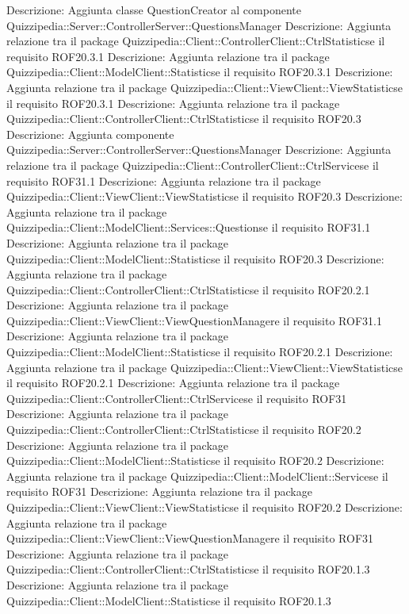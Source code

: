 Descrizione: Aggiunta classe QuestionCreator al componente Quizzipedia::Server::ControllerServer::QuestionsManager 
Descrizione: Aggiunta relazione tra il package Quizzipedia::Client::ControllerClient::CtrlStatisticse il requisito ROF20.3.1 
Descrizione: Aggiunta relazione tra il package Quizzipedia::Client::ModelClient::Statisticse il requisito ROF20.3.1 
Descrizione: Aggiunta relazione tra il package Quizzipedia::Client::ViewClient::ViewStatisticse il requisito ROF20.3.1 
Descrizione: Aggiunta relazione tra il package Quizzipedia::Client::ControllerClient::CtrlStatisticse il requisito ROF20.3 
Descrizione: Aggiunta componente Quizzipedia::Server::ControllerServer::QuestionsManager 
Descrizione: Aggiunta relazione tra il package Quizzipedia::Client::ControllerClient::CtrlServicese il requisito ROF31.1 
Descrizione: Aggiunta relazione tra il package Quizzipedia::Client::ViewClient::ViewStatisticse il requisito ROF20.3 
Descrizione: Aggiunta relazione tra il package Quizzipedia::Client::ModelClient::Services::Questionse il requisito ROF31.1 
Descrizione: Aggiunta relazione tra il package Quizzipedia::Client::ModelClient::Statisticse il requisito ROF20.3 
Descrizione: Aggiunta relazione tra il package Quizzipedia::Client::ControllerClient::CtrlStatisticse il requisito ROF20.2.1 
Descrizione: Aggiunta relazione tra il package Quizzipedia::Client::ViewClient::ViewQuestionManagere il requisito ROF31.1 
Descrizione: Aggiunta relazione tra il package Quizzipedia::Client::ModelClient::Statisticse il requisito ROF20.2.1 
Descrizione: Aggiunta relazione tra il package Quizzipedia::Client::ViewClient::ViewStatisticse il requisito ROF20.2.1 
Descrizione: Aggiunta relazione tra il package Quizzipedia::Client::ControllerClient::CtrlServicese il requisito ROF31 
Descrizione: Aggiunta relazione tra il package Quizzipedia::Client::ControllerClient::CtrlStatisticse il requisito ROF20.2 
Descrizione: Aggiunta relazione tra il package Quizzipedia::Client::ModelClient::Statisticse il requisito ROF20.2 
Descrizione: Aggiunta relazione tra il package Quizzipedia::Client::ModelClient::Servicese il requisito ROF31 
Descrizione: Aggiunta relazione tra il package Quizzipedia::Client::ViewClient::ViewStatisticse il requisito ROF20.2 
Descrizione: Aggiunta relazione tra il package Quizzipedia::Client::ViewClient::ViewQuestionManagere il requisito ROF31 
Descrizione: Aggiunta relazione tra il package Quizzipedia::Client::ControllerClient::CtrlStatisticse il requisito ROF20.1.3 
Descrizione: Aggiunta relazione tra il package Quizzipedia::Client::ModelClient::Statisticse il requisito ROF20.1.3 
